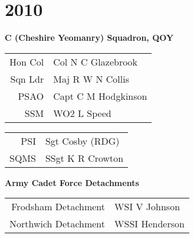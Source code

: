 \chapter*{2010}

\begin{center}
  \Large
  \textbf{C (Cheshire Yeomanry) Squadron, QOY}
\end{center}

\begin{center}
  \begin{tabular}{rl}
    Hon Col & Col N C Glazebrook \\
    Sqn Ldr & Maj R W N Collis \\
    PSAO & Capt C M Hodgkinson \\
    SSM & WO2 L Speed \\
  \end{tabular}
\end{center}

\begin{center}
  \begin{tabular}{rl}
    PSI & Sgt Cosby (RDG) \\
    SQMS & SSgt K R Crowton \\
  \end{tabular}
\end{center}

\begin{center}
  \Large
  \textbf{Army Cadet Force Detachments}
\end{center}

\begin{center}
  \begin{tabular}{rl}
    Frodsham Detachment & WSI V Johnson \\
    Northwich Detachment & WSSI Henderson \\
  \end{tabular}
\end{center}
